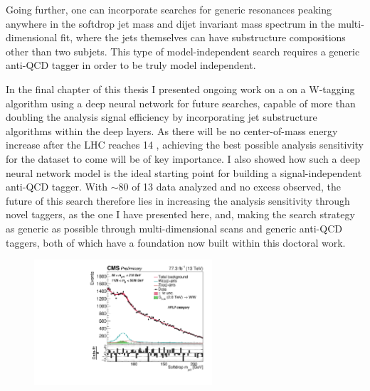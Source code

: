 Going further, one can incorporate searches for generic resonances peaking anywhere in the softdrop jet mass and dijet invariant mass spectrum in the multi-dimensional fit, where the jets themselves can have substructure compositions other than two subjets. This type of model-independent search requires a generic anti-QCD tagger in order to be truly model independent. \par
In the final chapter of this thesis I presented ongoing work on a on a W-tagging algorithm using a deep neural network for future searches, capable of more than doubling the analysis signal efficiency by incorporating jet substructure algorithms within the deep layers. As there will be no center-of-mass energy increase after the LHC reaches 14 \TeV, achieving the best possible analysis sensitivity for the dataset to come will be of key importance. I also showed how such a deep neural network model is the ideal starting point for building a signal-independent anti-QCD tagger. With $\sim80$ \fbinv of 13 \TeV data analyzed and no excess observed, the future of this search therefore lies in increasing the analysis sensitivity through novel taggers, as the one I have presented here, and, making the search strategy as generic as possible through multi-dimensional scans and generic anti-QCD taggers, both of which have a foundation now built within this doctoral work.

\begin{figure}[b!]
\centering
\includegraphics[width=0.59\textwidth]{figures/analysis/search3/AN-17-303/postfitchecks/postfit_HPLP_unblind/PostFitComboHPLP_X-Proj__y___0_-1_z___0_-1.pdf}
\label{fig:summary}
\end{figure}
